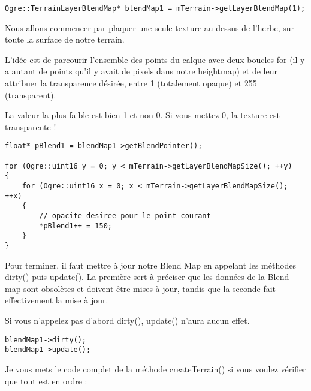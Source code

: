 \begin{lstlisting}[caption={R\'ecup\'eration du Blend Map pour le premier terrain}]
Ogre::TerrainLayerBlendMap* blendMap1 = mTerrain->getLayerBlendMap(1);
\end{lstlisting}

Nous allons commencer par plaquer une seule texture au-dessus de l'herbe, sur toute la surface de notre terrain.

L'id\'ee est de parcourir l'ensemble des points du calque avec deux boucles for (il y a autant de points qu'il y avait de pixels dans notre heightmap) et de leur attribuer la transparence d\'esir\'ee, entre 1 (totalement opaque) et 255 (transparent).

La valeur la plus faible est bien 1 et non 0. Si vous mettez 0, la texture est transparente !

\begin{lstlisting}[caption={Attribution de la transparence d\'esir\'ee sur tous les points du calque}]
float* pBlend1 = blendMap1->getBlendPointer();

for (Ogre::uint16 y = 0; y < mTerrain->getLayerBlendMapSize(); ++y)
{
    for (Ogre::uint16 x = 0; x < mTerrain->getLayerBlendMapSize(); ++x)
    {   
        // opacite desiree pour le point courant
        *pBlend1++ = 150;
    }
}
\end{lstlisting}















Pour terminer, il faut mettre \`a jour notre Blend Map en appelant les m\'ethodes dirty() puis update(). La premi\`ere sert \`a pr\'eciser que les donn\'ees de la Blend map sont obsol\`etes et doivent \^etre mises \`a jour, tandis que la seconde fait effectivement la mise \`a jour.

Si vous n'appelez pas d'abord dirty(), update() n'aura aucun effet.

\begin{lstlisting}[caption={Mise \`a jour de la Blend Map}]
blendMap1->dirty();
blendMap1->update();
\end{lstlisting}

Je vous mets le code complet de la m\'ethode createTerrain() si vous voulez v\'erifier que tout est en ordre :

